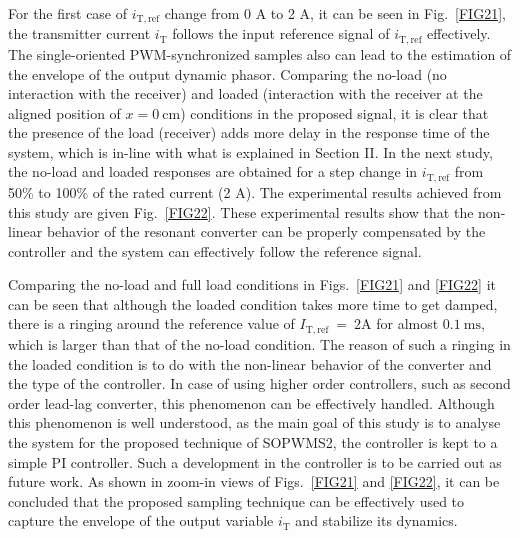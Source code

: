 \documentclass[journal,a4paper,10pt,twoside]{IEEEtran} %
\begin{document}
	 For the first case of $i_{\mathrm{T,ref}}$ change from 0 A to 2 A, it can be seen in Fig.~\ref{FIG21}, the transmitter current $i_{\mathrm{T}}$ follows the input reference signal of $i_\mathrm{T,ref}$ effectively. The single-oriented PWM-synchronized samples also can lead to the estimation of the envelope of the output dynamic phasor. Comparing the no-load (no interaction with the receiver) and loaded (interaction with the receiver at the aligned position of $x=0~\mathrm{cm}$) conditions in the proposed signal, it is clear that the presence of the load (receiver) adds more delay in the response time of the system, which is in-line with what is explained in Section II.
	 In the next study, the no-load and loaded responses are obtained for a step change in $i_{\mathrm{T,ref}}$ from 50\% to 100\% of the rated current (2 A). The  experimental results achieved from this study are given Fig.~{\ref{FIG22}}. These experimental results show that the non-linear behavior of the resonant converter can be properly compensated by the controller and the system can effectively follow the reference signal.
	 
	 {\color{red}Comparing the no-load and full load conditions in Figs.~\ref{FIG21} and \ref{FIG22} it can be seen that although the loaded condition takes more time to get damped, there is a ringing around the reference value of $I_\mathrm{T,ref}~=~2\mathrm{A}$ for almost $0.1~\mathrm{ms}$, which is larger than that of the no-load condition. The reason of such a ringing in the loaded condition is to do with the non-linear behavior of the converter and the type of the controller. In case of using higher order controllers, such as second order lead-lag converter, this phenomenon can be effectively handled. Although this phenomenon is well understood, as the main goal of this study is to analyse the system for the proposed technique of SOPWMS2, the controller is kept to a simple PI controller. Such a development in the controller is to be carried out as future work.}
	 As shown in zoom-in views of Figs.~\ref{FIG21} and \ref{FIG22}, it can be concluded that the proposed sampling technique can be effectively used to capture the envelope of the output variable $i_\mathrm{T}$ and stabilize its dynamics.
	 
\end{document}
